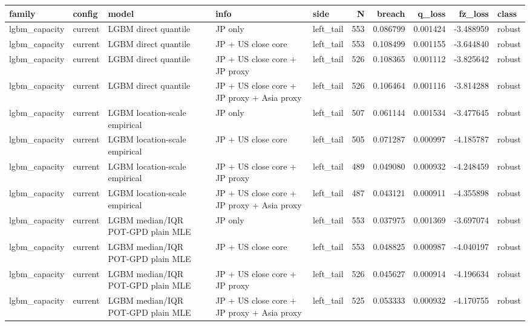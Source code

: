 \begin{tabular}{lll l lrrrrl}
\toprule
family & config & model & info & side & N & breach & q_loss & fz_loss & class \\
\midrule
lgbm\_capacity & current & LGBM direct quantile & JP only & left\_tail & 553 & 0.086799 & 0.001424 & -3.488959 & robust \\
lgbm\_capacity & current & LGBM direct quantile & JP + US close core & left\_tail & 553 & 0.108499 & 0.001155 & -3.644840 & robust \\
lgbm\_capacity & current & LGBM direct quantile & JP + US close core + JP proxy & left\_tail & 526 & 0.108365 & 0.001112 & -3.825642 & robust \\
lgbm\_capacity & current & LGBM direct quantile & JP + US close core + JP proxy + Asia proxy & left\_tail & 526 & 0.106464 & 0.001116 & -3.814288 & robust \\
lgbm\_capacity & current & LGBM location-scale empirical & JP only & left\_tail & 507 & 0.061144 & 0.001534 & -3.477645 & robust \\
lgbm\_capacity & current & LGBM location-scale empirical & JP + US close core & left\_tail & 505 & 0.071287 & 0.000997 & -4.185787 & robust \\
lgbm\_capacity & current & LGBM location-scale empirical & JP + US close core + JP proxy & left\_tail & 489 & 0.049080 & 0.000932 & -4.248459 & robust \\
lgbm\_capacity & current & LGBM location-scale empirical & JP + US close core + JP proxy + Asia proxy & left\_tail & 487 & 0.043121 & 0.000911 & -4.355898 & robust \\
lgbm\_capacity & current & LGBM median/IQR POT-GPD plain MLE & JP only & left\_tail & 553 & 0.037975 & 0.001369 & -3.697074 & robust \\
lgbm\_capacity & current & LGBM median/IQR POT-GPD plain MLE & JP + US close core & left\_tail & 553 & 0.048825 & 0.000987 & -4.040197 & robust \\
lgbm\_capacity & current & LGBM median/IQR POT-GPD plain MLE & JP + US close core + JP proxy & left\_tail & 526 & 0.045627 & 0.000914 & -4.196634 & robust \\
lgbm\_capacity & current & LGBM median/IQR POT-GPD plain MLE & JP + US close core + JP proxy + Asia proxy & left\_tail & 525 & 0.053333 & 0.000932 & -4.170755 & robust \\

\end{tabular}
